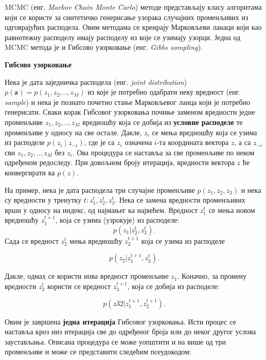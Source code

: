 \begin{de}
MCMC (енг. \textit{Markov Chain Monte Carlo}) методе представљају класу алгоритама који се користе за синтетичко генерисање узорака случајних променљивих из одговрајућих расподела. Овим методама се креирају Марковљеви ланаци који као равнотежну расподелу имају расподелу из које се узимају узорци. Једна од MCMC метода је и Гибсово узорковање (енг. \textit{Gibbs sampling}).
\end{de}


\textbf{Гибсово узорковање} 

Нека је дата заједничка расподела (енг. \textit{joint distribution}) $p(\textbf{z})= p(z_1,z_2,..,z_M)$ из које је потребно одабрати неку вредност (енг. \textit{sample}) и нека је познато  почетно стање Марковљевог ланца који је потребно генерисати. Сваки корак Гибсовог узорковања почиње заменом  вредности једне променљиве  $z_1,z_2,..,z_M$ вредношћу која се добија из \textbf{условне расподеле} те променљиве у односу на све остале.  Дакле, $z_i$ се мења вредношћу која се узима из расподеле $p(z_i \mid z_{-i})$, где је са $z_i$ означена $i$-та координата вектора $z$, а са   $z_{-i}$ сви $z_1,z_2,..,z_M$ без $z_i$. Ова процедура се наставља за све променљиве по неком одређеном редоследу. При довољном броју итерација, вредности вектора $z$ ће конвергирати ка $p(z)$.

На пример, нека је дата расподела три случајне променљиве $p(z_1,z_2,z_3)$ и нека су вредности у тренутку $t : z_1^{t},z_2^{t},z_3^{t}$. Нека се замена вредности променљивих врши у односу на индекс, од најмањег ка највећем. Вредност $z_1^{t}$ се мења новом вредношћу  $z_1^{t+1}$, која се узима (узрокује) из расподеле:
$$
p(z_1|z_2^{t},z_3^{t}).
$$
Сада се вредност $z_2^{t}$ мења вредношћу  $z_2^{t+1}$ која се узима из расподеле 

$$
p(z_2|z_1^{t+1},z_3^{t}).
$$

Дакле, одмах се користи нова вредност променљиве $z_1$. Коначно, за промену вредности $z_2^{t}$ користи се вредност $z_3^{t+1}$, која се добија из расподеле:

$$
p(z32|z_1^{t+1},z_2^{t+1}).
$$

Овим је завршена \textbf{једна итерација} Гибсовог узорковања. Исти процес се наставља кроз низ итерација све до одређеног броја или до неког другог услова заустављања. Описана процедура се може уопштити и на више од три променљиве и може се представити следећим псеудокодом:


